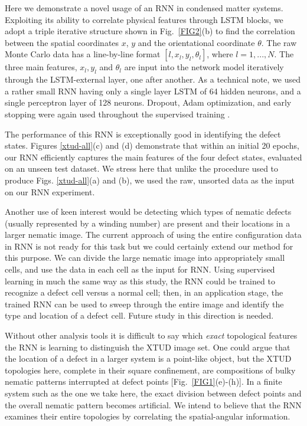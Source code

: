 Here we demonstrate a novel usage of an RNN in condensed matter systems. Exploiting its ability to correlate physical features through LSTM blocks, we adopt a triple iterative structure shown in Fig.\ \ref{FIG2}(b) to find the correlation between the spatial coordinates $x$, $y$ and the orientational coordinate $\theta$. The raw Monte Carlo data has a line-by-line format $[l, x_l, y_l, \theta_l]$, where $l=1,..., N$. The three main features, $x_l, y_l$ and $\theta_l$ are input into the network model iteratively through the LSTM-external layer, one after another. As a technical note, we used a rather small RNN having only a single layer LSTM of 64 hidden neurons, and a single perceptron layer of 128 neurons. Dropout, Adam optimization, and early stopping were again used throughout the supervised training \cite{dropout,nntricks,adam}.

The performance of this RNN is exceptionally good in identifying the defect states. Figures \ref{xtud-all}(c) and (d) demonstrate that within an initial 20 epochs, our RNN efficiently captures the main features of the four defect states, evaluated on an unseen test dataset. We stress here that unlike the procedure used to produce Figs. \ref{xtud-all}(a) and (b), we used the raw, unsorted data as the input on our RNN experiment. 

Another use of keen interest would be detecting which types of nematic defects (usually represented by a winding number) are present and their locations in a larger nematic image.
The current approach of using the entire configuration data in RNN is not ready for this task but we could certainly extend our method for this purpose. We can divide the large nematic image into appropriately small cells, and use the data in each cell as the input for RNN.  Using supervised learning in much the same way as this study, the RNN could be trained to recognize a defect cell versus a normal cell; then, in an application stage, 
the trained RNN can be used to sweep through the entire image and identify the type and location of a defect cell. Future study in this direction is needed.


Without other analysis tools it is difficult to say which \textit{exact} topological features the RNN is learning to distinguish the XTUD image set.
One could argue that the
location of a defect in a larger system is a point-like object, but the XTUD topologies here, complete in their square confinement, are compositions of bulky nematic patterns interrupted at defect points [Fig.~\ref{FIG1}(e)-(h)]. In a finite system such as the one we take here, the exact division between defect points and the overall nematic pattern becomes artificial.
We intend to believe that the RNN examines their entire topologies
by correlating the spatial-angular information.

